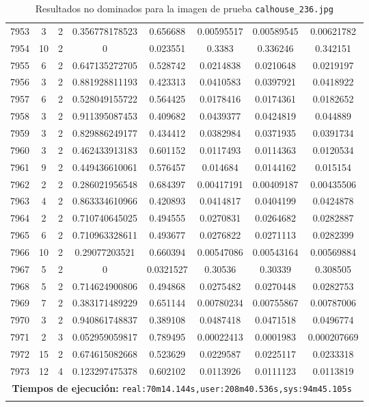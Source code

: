 \begin{longtable}{|c|c|c|c|c|c|c|c|}
7953 & 3 & 2 & 0.356778178523 & 0.656688 & 0.00595517 & 0.00589545 & 0.00621782 \\
7954 & 10 & 2 & 0 & 0.023551 & 0.3383 & 0.336246 & 0.342151 \\
7955 & 6 & 2 & 0.647135272705 & 0.528742 & 0.0214838 & 0.0210648 & 0.0219197 \\
7956 & 3 & 2 & 0.881928811193 & 0.423313 & 0.0410583 & 0.0397921 & 0.0418922 \\
7957 & 6 & 2 & 0.528049155722 & 0.564425 & 0.0178416 & 0.0174361 & 0.0182652 \\
7958 & 3 & 2 & 0.911395087453 & 0.409682 & 0.0439377 & 0.0424819 & 0.044889 \\
7959 & 3 & 2 & 0.829886249177 & 0.434412 & 0.0382984 & 0.0371935 & 0.0391734 \\
7960 & 3 & 2 & 0.462433913183 & 0.601152 & 0.0117493 & 0.0114363 & 0.0120534 \\
7961 & 9 & 2 & 0.449436610061 & 0.576457 & 0.014684 & 0.0144162 & 0.015154 \\
7962 & 2 & 2 & 0.286021956548 & 0.684397 & 0.00417191 & 0.00409187 & 0.00435506 \\
7963 & 4 & 2 & 0.863334610966 & 0.420893 & 0.0414817 & 0.0404199 & 0.0424878 \\
7964 & 2 & 2 & 0.710740645025 & 0.494555 & 0.0270831 & 0.0264682 & 0.0282887 \\
7965 & 6 & 2 & 0.710963328611 & 0.493677 & 0.0276822 & 0.0271113 & 0.0282399 \\
7966 & 10 & 2 & 0.29077203521 & 0.660394 & 0.00547086 & 0.00543164 & 0.00569884 \\
7967 & 5 & 2 & 0 & 0.0321527 & 0.30536 & 0.30339 & 0.308505 \\
7968 & 5 & 2 & 0.714624900806 & 0.494868 & 0.0275482 & 0.0270448 & 0.0282753 \\
7969 & 7 & 2 & 0.383171489229 & 0.651144 & 0.00780234 & 0.00755867 & 0.00787006 \\
7970 & 3 & 2 & 0.940861748837 & 0.389108 & 0.0487418 & 0.0471518 & 0.0496774 \\
7971 & 2 & 3 & 0.052959059817 & 0.789495 & 0.00022413 & 0.0001983 & 0.000207669 \\
7972 & 15 & 2 & 0.674615082668 & 0.523629 & 0.0229587 & 0.0225117 & 0.0233318 \\
7973 & 12 & 4 & 0.123297475378 & 0.602102 & 0.0113926 & 0.0111123 & 0.0113819 \\
\multicolumn{8}{|c|}{\textbf{Tiempos de ejecución:} \texttt{real:70m14.144s,user:208m40.536s,sys:94m45.105s
}}\\  \hline
\caption{Resultados no dominados para la imagen de prueba \texttt{calhouse\_236.jpg}}
\label{tab:calhouse_236}
\end{longtable}
\normalsize

